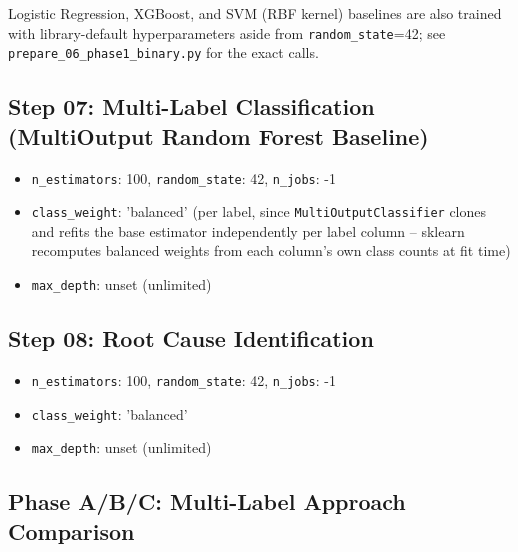 Logistic Regression, XGBoost, and SVM (RBF kernel) baselines are also trained with library-default hyperparameters aside from \texttt{random\_state}=42; see \texttt{prepare\_06\_phase1\_binary.py} for the exact calls.  %

\subsection{Step 07: Multi-Label Classification (MultiOutput Random Forest Baseline)}  %

\begin{itemize}
    \item \texttt{n\_estimators}: 100, \texttt{random\_state}: 42, \texttt{n\_jobs}: -1  %
    \item \texttt{class\_weight}: 'balanced' (per label, since \texttt{MultiOutputClassifier} clones and refits the base estimator independently per label column -- sklearn recomputes balanced weights from each column's own class counts at fit time)
    \item \texttt{max\_depth}: unset (unlimited)
\end{itemize}

\subsection{Step 08: Root Cause Identification}  %

\begin{itemize}
    \item \texttt{n\_estimators}: 100, \texttt{random\_state}: 42, \texttt{n\_jobs}: -1  %
    \item \texttt{class\_weight}: 'balanced'
    \item \texttt{max\_depth}: unset (unlimited)
\end{itemize}

\subsection{Phase A/B/C: Multi-Label Approach Comparison}

